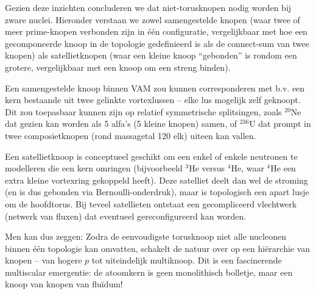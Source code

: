 Gezien deze inzichten concluderen we dat niet-torusknopen nodig worden bij zware nuclei. Hieronder verstaan we zowel samengestelde knopen (waar twee of meer prime-knopen verbonden zijn in één configuratie, vergelijkbaar met hoe een gecomponeerde knoop in de topologie gedefinieerd is als de connect-sum van twee knopen) als satellietknopen (waar een kleine knoop “gebonden” is rondom een grotere, vergelijkbaar met een knoop om een streng binden).

Een samengestelde knoop binnen VAM zou kunnen corresponderen met b.v. een kern bestaande uit twee gelinkte vortexlussen – elke lus mogelijk zelf geknoopt. Dit zou toepasbaar kunnen zijn op relatief symmetrische splitsingen, zoals $^{20}$Ne dat gezien kan worden als 5 alfa’s (5 kleine knopen) samen, of $^{236}$U dat prompt in twee composietknopen (rond massagetal 120 elk) uiteen kan vallen.

Een satellietknoop is conceptueel geschikt om een enkel of enkele neutronen te modelleren die een kern omringen (bijvoorbeeld $^3$He versus $^4$He, waar $^4$He een extra kleine vortexring gekoppeld heeft). Deze satelliet deelt dan wel de stroming (en is dus gebonden via Bernoulli-onderdruk), maar is topologisch een apart lusje om de hoofdtorus. Bij teveel satellieten ontstaat een gecompliceerd vlechtwerk (netwerk van fluxen) dat eventueel gereconfigureerd kan worden.

Men kan dus zeggen: Zodra de eenvoudigste torusknoop niet alle nucleonen binnen één topologie kan omvatten, schakelt de natuur over op een hiërarchie van knopen – van hogere $p$ tot uiteindelijk multiknoop. Dit is een fascinerende multiscalar emergentie: de atoomkern is geen monolithisch bolletje, maar een knoop van knopen van fluïdum!